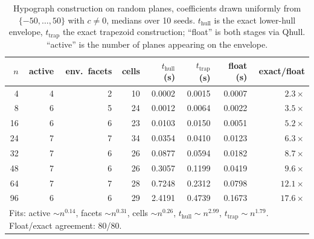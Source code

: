 \begin{table}[htbp]
\centering
\begin{tabular}{rrrrrrrr}
\toprule
$n$ & active & env.\ facets & cells & $t_{\text{hull}}$ (s) & $t_{\text{trap}}$ (s) & float (s) & exact/float \\
\midrule
4 & 4 & 2 & 10 & 0.0002 & 0.0015 & 0.0007 & $2.3\times$ \\
8 & 6 & 5 & 24 & 0.0012 & 0.0064 & 0.0022 & $3.5\times$ \\
16 & 6 & 6 & 23 & 0.0103 & 0.0150 & 0.0051 & $5.2\times$ \\
24 & 7 & 7 & 34 & 0.0354 & 0.0410 & 0.0123 & $6.3\times$ \\
32 & 7 & 6 & 26 & 0.0877 & 0.0594 & 0.0182 & $8.7\times$ \\
48 & 7 & 6 & 26 & 0.3057 & 0.1199 & 0.0419 & $9.6\times$ \\
64 & 7 & 7 & 28 & 0.7248 & 0.2312 & 0.0798 & $12.1\times$ \\
96 & 6 & 6 & 29 & 2.4191 & 0.4739 & 0.1673 & $17.6\times$ \\
\midrule
\multicolumn{8}{l}{Fits: active ${\sim}n^{0.14}$, facets ${\sim}n^{0.31}$, cells ${\sim}n^{0.26}$, $t_{\text{hull}} {\sim} n^{2.99}$, $t_{\text{trap}} {\sim} n^{1.79}$. Float/exact agreement: 80/80.} \\
\bottomrule
\end{tabular}
\caption{Hypograph construction on random planes, coefficients drawn uniformly from $\{-50,\dots,50\}$ with $c \neq 0$, medians over 10 seeds. $t_{\text{hull}}$ is the exact lower-hull envelope, $t_{\text{trap}}$ the exact trapezoid construction; ``float'' is both stages via Qhull. ``active'' is the number of planes appearing on the envelope.}
\label{tab:env-random}
\end{table}
